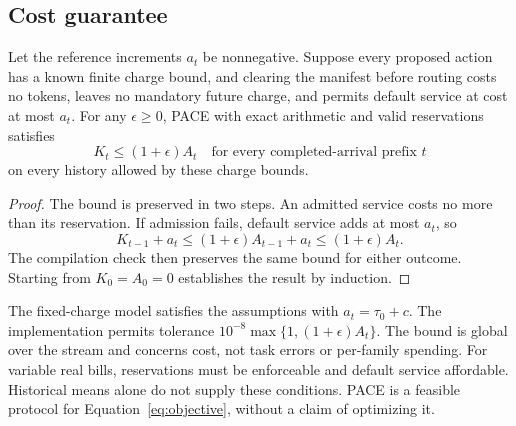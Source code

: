 \subsection{Cost guarantee}
\label{sec:guarantee}

\begin{theorem}
\label{thm:cost-protection}
Let the reference increments $a_t$ be nonnegative.
Suppose every proposed action has a known finite charge bound, and clearing the manifest before routing costs no tokens, leaves no mandatory future charge, and permits default service at cost at most $a_t$.
For any $\epsilon\geq0$, PACE with exact arithmetic and valid reservations satisfies
\begin{equation}
K_t\leq(1+\epsilon)A_t
\quad\text{for every completed-arrival prefix }t
\label{eq:cost-guarantee}
\end{equation}
on every history allowed by these charge bounds.
\end{theorem}

\begin{proof}
The bound is preserved in two steps.
An admitted service costs no more than its reservation.
If admission fails, default service adds at most $a_t$, so
\[
K_{t-1}+a_t\leq(1+\epsilon)A_{t-1}+a_t\leq(1+\epsilon)A_t.
\]
The compilation check then preserves the same bound for either outcome.
Starting from $K_0=A_0=0$ establishes the result by induction.
\end{proof}

The fixed-charge model satisfies the assumptions with $a_t=\tau_0+c$.
The implementation permits tolerance $10^{-8}\max\{1,(1+\epsilon)A_t\}$.
The bound is global over the stream and concerns cost, not task errors or per-family spending.
For variable real bills, reservations must be enforceable and default service affordable.
Historical means alone do not supply these conditions.
PACE is a feasible protocol for Equation~\ref{eq:objective}, without a claim of optimizing it.
